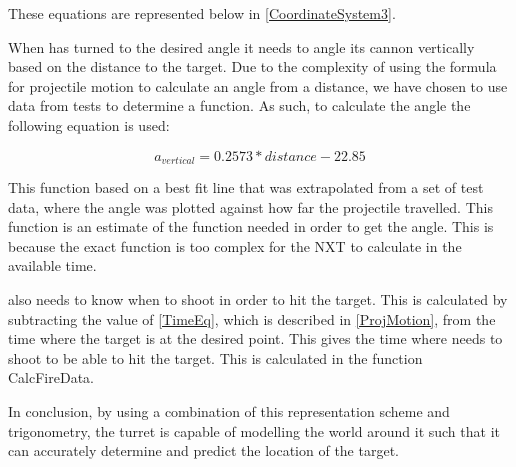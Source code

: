 These equations are represented below in \autoref{CoordinateSystem3}.


When \name has turned to the desired angle it needs to angle its cannon
vertically based on the distance to the target. Due to the complexity of using
the formula for projectile motion to calculate an angle from a distance, we have
chosen to use data from tests to determine a function. As such, to calculate the
angle the following equation is used:

\begin{equation}\label{locEq4}
a_{vertical}=0.2573*distance-22.85
\end{equation} 

This function based on a best fit line that was extrapolated from a set of test
data, where the angle was plotted against how far the projectile travelled. This
function is an estimate of the function needed in order to get the angle. This
is because the exact function is too complex for the NXT to calculate in the available time.\nl

\name also needs to know when to shoot in order to hit the target.
This is calculated by subtracting the value of \autoref{TimeEq}, which is described in
\autoref{ProjMotion}, from the time where the target is at the desired point.
This gives the time where \name needs to shoot to be able to hit the target.
This is calculated in the function CalcFireData.

In conclusion, by using a combination of this representation scheme and
trigonometry, the turret is capable of modelling the world around it such that
it can accurately determine and predict the location of the target.